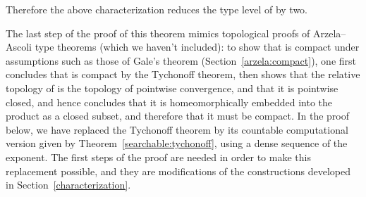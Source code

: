 \documentclass{LMCS}
\begin{document}
Therefore the above characterization reduces the type level of
 by two.

\medskip

The last step of the proof of this theorem mimics topological proofs
of Arzela--Ascoli type theorems (which we haven't included): to show
that  is compact under assumptions such as those of
Gale's theorem (Section~\ref{arzela:compact}), one first concludes
that  is compact by the Tychonoff theorem, then
shows that the relative topology of  is the topology of pointwise
convergence, and that it is pointwise closed, and hence concludes that
it is homeomorphically embedded into the product as a closed subset,
and therefore that it must be compact. In the proof below, we have
replaced the Tychonoff theorem by its countable computational version
given by Theorem~\ref{searchable:tychonoff}, using a dense sequence of
the exponent. The first steps of the proof are needed in order to
make this replacement possible, and they are modifications of the
constructions developed in Section~\ref{characterization}.
\end{document}
